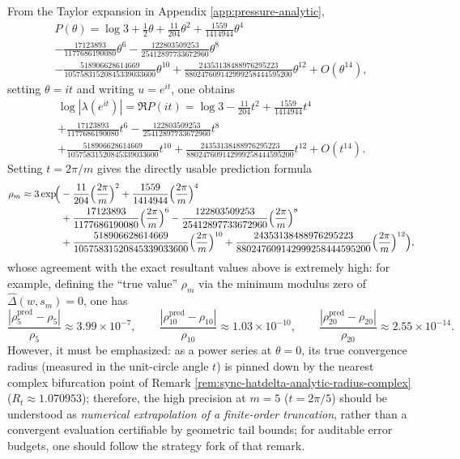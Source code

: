 


\begin{remark}\label{rem:sync-rho-pressure-asymp}
From the Taylor expansion in Appendix \ref{app:pressure-analytic},
\[
\begin{aligned}
P(\theta)=\log 3+\frac12\theta+\frac{11}{204}\theta^2+\frac{1559}{1414944}\theta^4\\
-\frac{17123893}{1177686190080}\theta^6-\frac{122803509253}{25412897733672960}\theta^8\\
-\frac{518906628614669}{10575831520845339033600}\theta^{10}
+\frac{24353138488976295223}{880247609142999258444595200}\theta^{12}
+O(\theta^{14}),
\end{aligned}
\]
setting $\theta=it$ and writing $u=e^{it}$, one obtains
\[
\begin{aligned}
\log|\lambda(e^{it})|=\Re P(it)=\log 3-\frac{11}{204}t^2+\frac{1559}{1414944}t^4\\
+\frac{17123893}{1177686190080}t^6-\frac{122803509253}{25412897733672960}t^8\\
+\frac{518906628614669}{10575831520845339033600}t^{10}
+\frac{24353138488976295223}{880247609142999258444595200}t^{12}
+O(t^{14}).
\end{aligned}
\]
Setting $t=2\pi/m$ gives the directly usable prediction formula
\[
\begin{aligned}
\rho_m\approx 3\exp\!\Bigl(
&-\frac{11}{204}\Bigl(\frac{2\pi}{m}\Bigr)^2+\frac{1559}{1414944}\Bigl(\frac{2\pi}{m}\Bigr)^4\\
&+\frac{17123893}{1177686190080}\Bigl(\frac{2\pi}{m}\Bigr)^6-\frac{122803509253}{25412897733672960}\Bigl(\frac{2\pi}{m}\Bigr)^8\\
&+\frac{518906628614669}{10575831520845339033600}\Bigl(\frac{2\pi}{m}\Bigr)^{10}
+\frac{24353138488976295223}{880247609142999258444595200}\Bigl(\frac{2\pi}{m}\Bigr)^{12}
\Bigr),
\end{aligned}
\]
whose agreement with the exact resultant values above is extremely high: for example, defining the ``true value'' $\rho_m$ via the minimum modulus zero of $\widehat\Delta(w,s_m)=0$, one has
\[
\frac{|\rho_5^{\mathrm{pred}}-\rho_5|}{\rho_5}\approx 3.99\times 10^{-7},\qquad
\frac{|\rho_{10}^{\mathrm{pred}}-\rho_{10}|}{\rho_{10}}\approx 1.03\times 10^{-10},\qquad
\frac{|\rho_{20}^{\mathrm{pred}}-\rho_{20}|}{\rho_{20}}\approx 2.55\times 10^{-14}.
\]
However, it must be emphasized: as a power series at \(\theta=0\), its true convergence radius (measured in the unit-circle angle \(t\)) is pinned down by the nearest complex bifurcation point of Remark \ref{rem:sync-hatdelta-analytic-radius-complex} (\(R_t\approx 1.070953\)); therefore, the high precision at \(m=5\) (\(t=2\pi/5\)) should be understood as \emph{numerical extrapolation of a finite-order truncation}, rather than a convergent evaluation certifiable by geometric tail bounds; for auditable error budgets, one should follow the strategy fork of that remark.
\end{remark}

